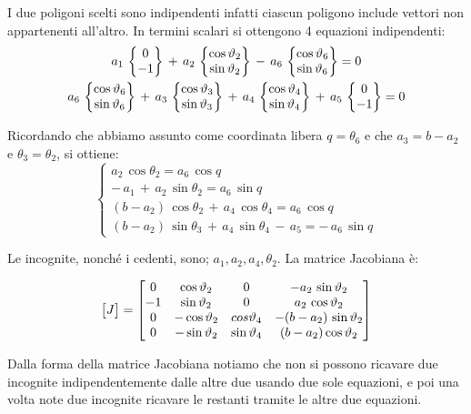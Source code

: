 	I due poligoni scelti sono indipendenti infatti ciascun poligono include vettori non appartenenti all'altro. In termini scalari si ottengono 4 equazioni indipendenti:
	\begin{gather*}
	a_1\,\begin{Bmatrix}0\\-1\end{Bmatrix}\,+\,a_2\,\begin{Bmatrix}\cos{\vartheta_2}\\\sin{\vartheta_2}\end{Bmatrix}\,-\,a_6\,\begin{Bmatrix}\cos{\vartheta_6}\\\sin{\vartheta_6}\end{Bmatrix}=0\\
	a_6\,\begin{Bmatrix}\cos{\vartheta_6}\\\sin{\vartheta_6}\end{Bmatrix}\,+\,a_3\,\begin{Bmatrix}\cos{\vartheta_3}\\\sin{\vartheta_3}\end{Bmatrix}\,+\,a_4\,\begin{Bmatrix}\cos{\vartheta_4}\\\sin{\vartheta_4}\end{Bmatrix}\,+\,a_5\,\begin{Bmatrix}0\\-1\end{Bmatrix}=0
	\end{gather*}
	
	Ricordando che abbiamo assunto come coordinata libera $q= \theta_6$ e che $a_3=b-a_2$ e $\theta_3=\theta_2$, si ottiene:
	\[
	\begin{cases}
	a_2\,\cos{\theta_2} = a_6\,\cos{q}\\
	-\,a_1\,+\,a_2\,\sin{\theta_2} = a_6\,\sin{q}\\
	(b-a_2)\,\cos{\theta_2}\,+\,a_4\,\cos{\theta_4} = a_6\,\cos{q}\\
	(b-a_2)\,\sin{\theta_3}\,+\,a_4\,\sin{\theta_4}\,-\,a_5 = -\,a_6\,\sin{q}
	\end{cases}
	\]
	
	Le incognite, nonché i cedenti, sono; $a_1,a_2,a_4,\theta_2$. La matrice Jacobiana è:
	\vspace{1mm}
	
	\begin{minipage}{.5\textwidth}
	\[
	\begin{bmatrix}J\end{bmatrix} = \begin{bmatrix}0 & \cos{\vartheta_2} & 0 & -a_2\,\sin{\vartheta_2}\\
	-1 & \sin{\vartheta_2} & 0 & a_2\,\cos{\vartheta_2}\\
	0 & -\cos{\vartheta_2} & cos{\vartheta_4} & -(b-a_2)\,\sin{\vartheta_2}\\
	0 & -\sin{\vartheta_2} & \sin{\vartheta_4} & (b-a_2) \cos{\vartheta_2}\end{bmatrix}
	\]
		\end{minipage}
		\hfill
		\begin{minipage}{.5\textwidth}
		Dalla forma della matrice Jacobiana notiamo che non si possono ricavare due incognite indipendentemente dalle altre due usando due sole equazioni, e poi una volta note due incognite ricavare le restanti tramite le altre due equazioni.
		\end{minipage}
		\vspace{1mm}
		

